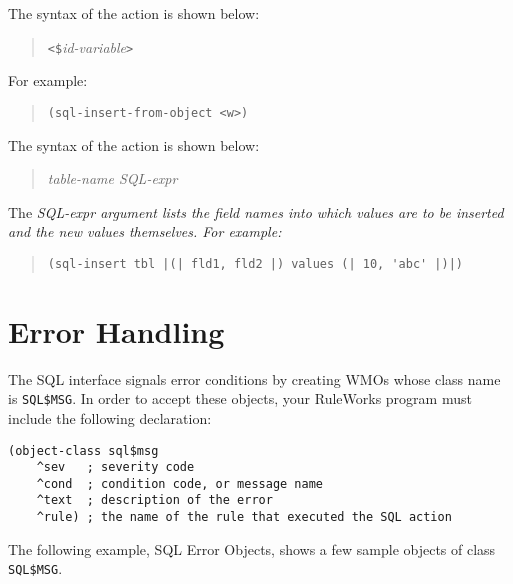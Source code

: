 The syntax of the  action is shown below:

\begin{quote}
   \verb|<$|\it{id-variable}\verb|>|
\end{quote}

For example:

\begin{quote}
\begin{verbatim}
(sql-insert-from-object <w>)
\end{verbatim}
\end{quote}

The syntax of the  action is shown below:

\begin{quote}
   \it{table-name} \it{SQL-expr}
\end{quote}

The \it{SQL-expr} argument lists the field names into which values are
to be inserted and the new values themselves. For example:

\begin{quote}
\begin{verbatim}
(sql-insert tbl |(| fld1, fld2 |) values (| 10, 'abc' |)|)
\end{verbatim}
\end{quote}

\section{Error Handling}

The SQL interface signals error conditions by creating WMOs whose
class name is
\verb|SQL$MSG|. In order to accept these objects, your RuleWorks
program must include the following  declaration:

\begin{exampl}
\begin{verbatim}
(object-class sql$msg
    ^sev   ; severity code
    ^cond  ; condition code, or message name
    ^text  ; description of the error
    ^rule) ; the name of the rule that executed the SQL action
\end{verbatim}
\end{exampl}
   
The following example, SQL Error Objects, shows a few sample objects
of class \verb|SQL$MSG|.

